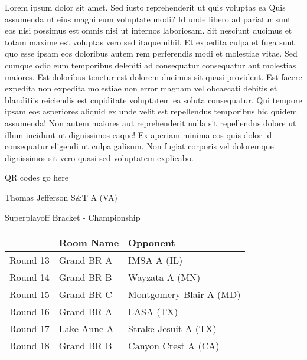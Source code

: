 \documentclass{article}%
\begin{document}
\vspace*{8pt}%
\linebreak%
\newline%
\newline%
Lorem ipsum dolor sit amet. Sed iusto reprehenderit ut quis voluptas ea Quis assumenda ut eius magni eum voluptate modi? Id unde libero ad pariatur sunt eos nisi possimus est omnis nisi ut internos laboriosam. Sit nesciunt ducimus et totam maxime est voluptas vero sed itaque nihil. Et expedita culpa et fuga sunt quo esse ipsam eos doloribus autem rem perferendis modi et molestiae vitae.\newline%
\newline%
Sed cumque odio eum temporibus deleniti ad consequatur consequatur aut molestias maiores. Est doloribus tenetur est dolorem ducimus sit quasi provident. Est facere expedita non expedita molestiae non error magnam vel obcaecati debitis et blanditiis reiciendis est cupiditate voluptatem ea soluta consequatur. Qui tempore ipsam eos asperiores aliquid ex unde velit est repellendus temporibus hic quidem assumenda!\newline%
\newline%
Non autem maiores aut reprehenderit nulla sit repellendus dolore ut illum incidunt ut dignissimos eaque! Ex aperiam minima eos quis dolor id consequatur eligendi ut culpa galisum. Non fugiat corporis vel doloremque dignissimos sit vero quasi sed voluptatem explicabo.\newline%
\newline%
%
\vspace*{30pt}%
\begin{center}%
\begin{Huge}%
QR codes go here%
\end{Huge}%
\end{center}%
\newpage%
\begin{center}%
\begin{Huge}%
Thomas Jefferson S\&T A (VA)%
\end{Huge}%
\vspace*{8pt}%
\linebreak%
\begin{Large}%
Superplayoff Bracket {-} Championship%
\end{Large}%
\end{center}%
%
\begin{tabularx}{\textwidth}{|c|Y|Y|}%
\hline%
&Room Name&Opponent\\%
\hline%
Round 13&Grand BR A&IMSA A (IL)\\%
Round 14&Grand BR B&Wayzata A (MN)\\%
Round 15&Grand BR C&Montgomery Blair A (MD)\\%
Round 16&Grand BR A&LASA (TX)\\%
Round 17&Lake Anne A&Strake Jesuit A (TX)\\%
Round 18&Grand BR B&Canyon Crest A (CA)\\%
\hline%
\end{tabularx}%
\end{document}

